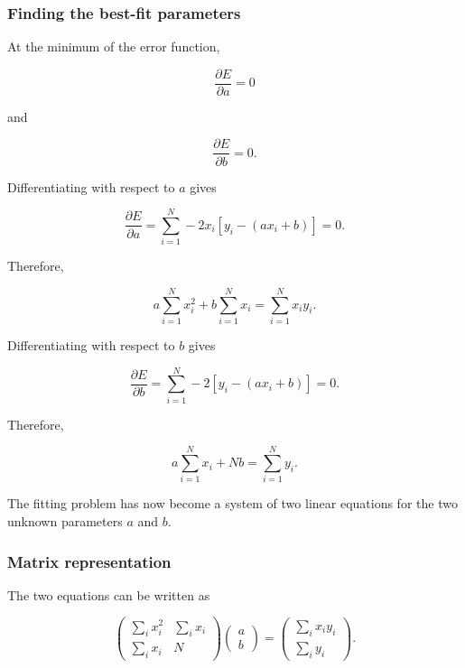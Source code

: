 \subsubsection{Finding the best-fit parameters}

At the minimum of the error function,

\begin{equation}
    \frac{\partial E}{\partial a}=0
\end{equation}

and

\begin{equation}
    \frac{\partial E}{\partial b}=0.
\end{equation}

Differentiating with respect to $a$ gives

\begin{equation}
    \frac{\partial E}{\partial a}=\sum_{i=1}^{N}-2x_i\left[y_i-(ax_i+b)\right]=0.
\end{equation}

Therefore,

\begin{equation}
    a\sum_{i=1}^{N}x_i^2+b\sum_{i=1}^{N}x_i=\sum_{i=1}^{N}x_iy_i.
\end{equation}

Differentiating with respect to $b$ gives

\begin{equation}
    \frac{\partial E}{\partial b}=\sum_{i=1}^{N}-2\left[y_i-(ax_i+b)\right]=0.
\end{equation}

Therefore,

\begin{equation}
    a\sum_{i=1}^{N}x_i+Nb=\sum_{i=1}^{N}y_i.
\end{equation}

The fitting problem has now become a system of two linear equations for the two unknown parameters $a$ and $b$.


\subsubsection{Matrix representation}

The two equations can be written as

\begin{equation}
    \begin{pmatrix}
        \sum_i x_i^2 & \sum_i x_i \\
        \sum_i x_i & N
    \end{pmatrix}
    \begin{pmatrix}
        a \\
        b
    \end{pmatrix}
    =
    \begin{pmatrix}
        \sum_i x_i y_i \\
        \sum_i y_i
    \end{pmatrix}.
\end{equation}

